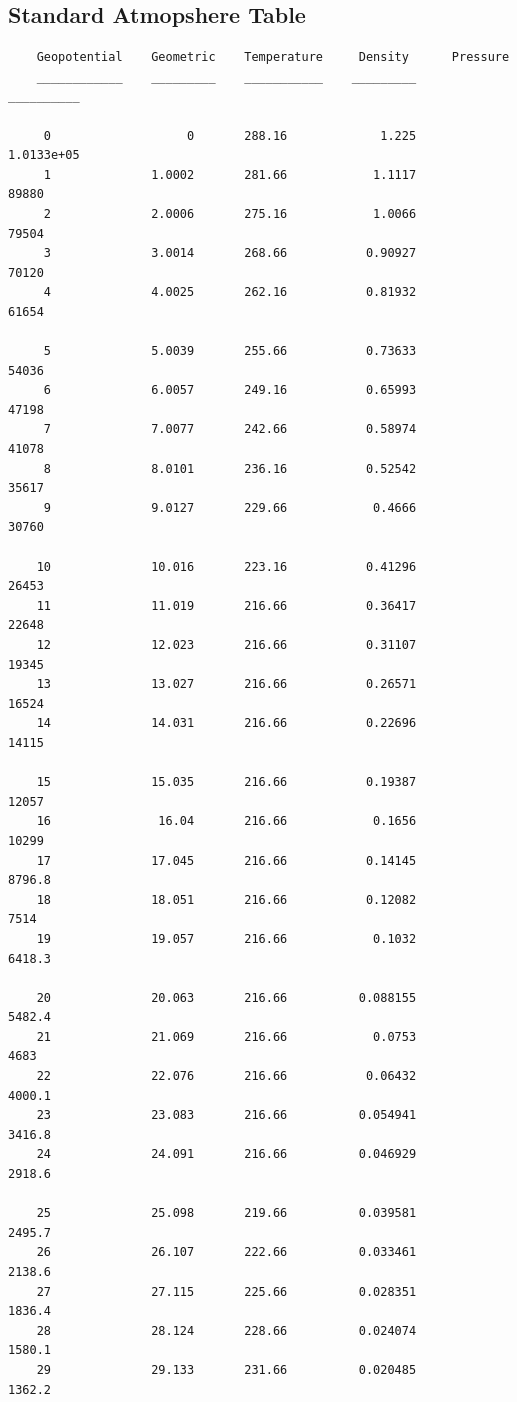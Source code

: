 \documentclass{article}
\begin{document}
\subsection{Standard Atmopshere Table}
        \begin{verbatim}
    Geopotential    Geometric    Temperature     Density      Pressure 
    ____________    _________    ___________    _________    __________

     0                   0       288.16             1.225    1.0133e+05
     1              1.0002       281.66            1.1117         89880
     2              2.0006       275.16            1.0066         79504
     3              3.0014       268.66           0.90927         70120
     4              4.0025       262.16           0.81932         61654
     
     5              5.0039       255.66           0.73633         54036
     6              6.0057       249.16           0.65993         47198
     7              7.0077       242.66           0.58974         41078
     8              8.0101       236.16           0.52542         35617
     9              9.0127       229.66            0.4666         30760
    
    10              10.016       223.16           0.41296         26453
    11              11.019       216.66           0.36417         22648
    12              12.023       216.66           0.31107         19345
    13              13.027       216.66           0.26571         16524
    14              14.031       216.66           0.22696         14115
    
    15              15.035       216.66           0.19387         12057
    16               16.04       216.66            0.1656         10299
    17              17.045       216.66           0.14145        8796.8
    18              18.051       216.66           0.12082          7514
    19              19.057       216.66            0.1032        6418.3
    
    20              20.063       216.66          0.088155        5482.4
    21              21.069       216.66            0.0753          4683
    22              22.076       216.66           0.06432        4000.1
    23              23.083       216.66          0.054941        3416.8
    24              24.091       216.66          0.046929        2918.6
    
    25              25.098       219.66          0.039581        2495.7
    26              26.107       222.66          0.033461        2138.6
    27              27.115       225.66          0.028351        1836.4
    28              28.124       228.66          0.024074        1580.1
    29              29.133       231.66          0.020485        1362.2
    

\end{verbatim}
\end{document}
